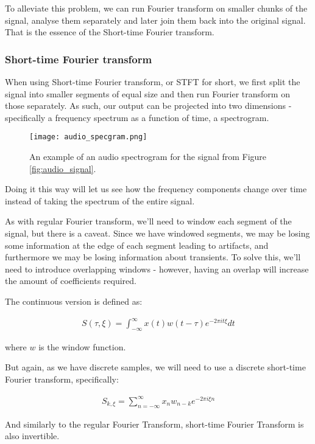 To alleviate this problem, we can run Fourier transform on smaller chunks of the signal, analyse them separately and later join them back into the original signal. That is the essence of the Short-time Fourier transform.

\subsubsection{Short-time Fourier transform}
When using Short-time Fourier transform, or STFT for short, we first split the signal into smaller segments of equal size and then run Fourier transform on those separately. As such, our output can be projected into two dimensions - specifically a frequency spectrum as a function of time, a spectrogram.

\begin{figure}[ht]
	\caption[Example audio spectrogram]{An example of an audio spectrogram for the signal from Figure \ref{fig:audio_signal}.}
	\centering
	\texttt{[image: audio\_specgram.png]}
\end{figure}

Doing it this way will let us see how the frequency components change over time instead of taking the spectrum of the entire signal.

As with regular Fourier transform, we'll need to window each segment of the signal, but there is a caveat. Since we have windowed segments, we may be losing some information at the edge of each segment leading to artifacts, and furthermore we may be losing information about transients. To solve this, we'll need to introduce overlapping windows - however, having an overlap will increase the amount of coefficients required.

The continuous version is defined as: \cite{Recoskie2014ConstrainedNM}

\begin{align}
S(\tau, \xi) = \int_{-\infty}^{\infty}x(t)w(t-\tau)e^{-2\pi it\xi}dt
\end{align}

where $w$ is the window function.

But again, as we have discrete samples, we will need to use a discrete short-time Fourier transform, specifically:

\begin{align}
S_{k, \xi} = \sum_{n=-\infty}^{\infty}x_nw_{n-k}e^{-2\pi i\xi n}
\end{align}

And similarly to the regular Fourier Transform, short-time Fourier Transform is also invertible. \cite{selesnick_2009}

